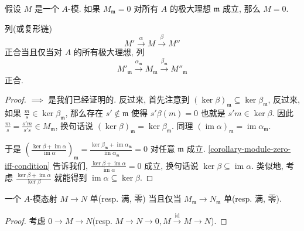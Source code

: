 \begin{corollary}
  \label{corollary-module-zero-iff-condition}
  假设 \( M \) 是一个 \( A \)-模. 如果 \( M_{\mathfrak{m}} = 0 \) 对所有 \( A \)
  的极大理想 \( \mathfrak{m} \) 成立, 那么 \( M = 0 \).
\end{corollary}

\begin{proposition}
  列(或复形链)
  \[
    M' \xrightarrow{\alpha} M \xrightarrow{\beta} M''
  \]
  正合当且仅当对 \( A \) 的所有极大理想, 列
  \[
    M'_{\mathfrak{m}} \xrightarrow{\alpha_{\mathfrak{m}}} M_{\mathfrak{m}}
    \xrightarrow{\beta_{\mathfrak{m}}} M''_{\mathfrak{m}}
  \]
  正合.
\end{proposition}
\begin{proof}
  \( \implies \) 是我们已经证明的. 反过来, 首先注意到 \(
  (\operatorname{ker}\beta)_{\mathfrak{m}} \subseteq
  \operatorname{ker}\beta_{\mathfrak{m}} \), 反过来, 如果 \( \frac{m}{s} \in
  \operatorname{ker} \beta_{\mathfrak{m}} \), 那么存在 \( s' \notin \mathfrak{m}
  \) 使得 \( s'\beta(m) = 0 \) 也就是 \( s'm \in \operatorname{ker}\beta \).
  因此 \( \frac{m}{s} = \frac{s'm}{s's} \in M_{\mathfrak{m}} \), 换句话说 \(
  (\operatorname{ker}\beta)_{\mathfrak{m}} =
  \operatorname{ker}\beta_{\mathfrak{m}} \). 同理 \(
  (\operatorname{im}\alpha)_{\mathfrak{m}} = \operatorname{im}
  \alpha_{\mathfrak{m}} \).

  于是 \( \left(\frac{\operatorname{ker} \beta +
    \operatorname{im}\alpha}{\operatorname{im} \alpha}\right)_{\mathfrak{m}} =
    \frac{\operatorname{ker}\beta_{\mathfrak{m}} +
      \operatorname{im}\alpha_{\mathfrak{m}}}{\operatorname{im}
    \alpha_{\mathfrak{m}}}  = 0 \) 对任意 \( \mathfrak{m} \) 成立. \cref{corollary-module-zero-iff-condition}
    告诉我们, \( \frac{\operatorname{ker}\beta +
    \operatorname{im}\alpha}{\operatorname{im}\alpha} = 0 \) 成立, 换句话说 \(
    \operatorname{ker} \beta \subseteq \operatorname{im} \alpha \). 类似地, 考虑
    \( \frac{\operatorname{ker} \beta + \operatorname{im}
    \alpha}{\operatorname{ker}\beta} \) 就能得到 \( \operatorname{im} \alpha
    \subseteq \operatorname{ker} \beta \).
\end{proof}

\begin{corollary}
  一个 \( A \)-模态射 \( M \to N \) 单(resp. 满, 零) 当且仅当 \(
  M_{\mathfrak{m}} \to N_{\mathfrak{m}} \) 单(resp. 满, 零).
\end{corollary}
\begin{proof}
  考虑 \( 0 \to M \to N \)(resp. \( M \to N \to 0, M
  \xrightarrow{\operatorname{id}} M \to N \)).
\end{proof}

